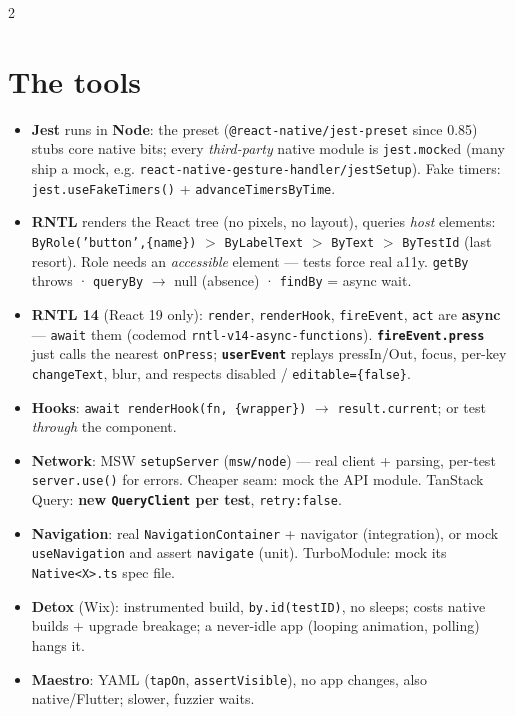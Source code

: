 \documentclass[8pt]{extarticle}
\begin{document}
\begin{multicols}{2}
\raggedright

\section{The tools}
\begin{itemize}\raggedright
  \item \textbf{Jest} runs in \textbf{Node}: the preset (\texttt{@react-native/jest-preset}
        since 0.85) stubs core native bits; every
        \emph{third-party} native module is \texttt{jest.mock}ed (many ship a mock, e.g.
        \texttt{react-native-gesture-handler/jestSetup}). Fake timers:
        \texttt{jest.useFakeTimers()} + \texttt{advanceTimersByTime}.
  \item \textbf{RNTL} renders the React tree (no pixels, no layout), queries \emph{host}
        elements: \texttt{ByRole('button',\{name\})} $>$ \texttt{ByLabelText} $>$
        \texttt{ByText} $>$ \texttt{ByTestId} (last resort). Role needs an \emph{accessible}
        element — tests force real a11y. \texttt{getBy} throws · \texttt{queryBy} $\to$ null
        (absence) · \texttt{findBy} = async wait.
  \item \textbf{RNTL 14} (React 19 only): \texttt{render}, \texttt{renderHook},
        \texttt{fireEvent}, \texttt{act} are \textbf{async} — \texttt{await} them (codemod
        \texttt{rntl-v14-async-functions}). \textbf{\texttt{fireEvent.press}} just calls the
        nearest \texttt{onPress}; \textbf{\texttt{userEvent}} replays pressIn/Out, focus, per-key
        \texttt{changeText}, blur, and respects disabled / \texttt{editable=\{false\}}.
  \item \textbf{Hooks}: \texttt{await renderHook(fn, \{wrapper\})} $\to$ \texttt{result.current};
        or test \emph{through} the component.
  \item \textbf{Network}: MSW \texttt{setupServer} (\texttt{msw/node}) — real client + parsing,
        per-test \texttt{server.use()} for errors. Cheaper seam: mock the API module.
        TanStack Query: \textbf{new \texttt{QueryClient} per test}, \texttt{retry:false}.
  \item \textbf{Navigation}: real \texttt{NavigationContainer} + navigator (integration), or
        mock \texttt{useNavigation} and assert \texttt{navigate} (unit). TurboModule: mock
        its \texttt{Native<X>.ts} spec file.
  \item \textbf{Detox} (Wix): instrumented build, \texttt{by.id(testID)}, no sleeps; costs
        native builds + upgrade breakage; a never-idle app (looping animation, polling) hangs it.
  \item \textbf{Maestro}: YAML (\texttt{tapOn}, \texttt{assertVisible}), no app changes,
        also native/Flutter; slower, fuzzier waits.
\end{itemize}


\end{multicols}
\end{document}
